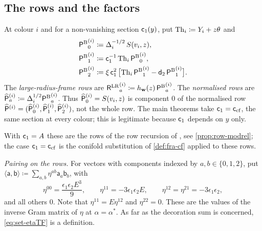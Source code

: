 
\subsection{The rows and the factors}
\label{sec:set-rows}

\begin{defn}
\label{def:set-rows}
At colour $i$ and for a non-vanishing section $\mathsf{c}_{1}(y)$, put $\mathrm{Th}_i\coloneqq Y_i+z\theta$ and
\begin{align*}
{\mathsf{P}^{\mathrm{B}}}_0^{(i)}&\coloneqq\Delta_i^{-1/2}\,S(v_i,z),\\
{\mathsf{P}^{\mathrm{B}}}_1^{(i)}&\coloneqq\mathsf{c}_{1}^{-1}\,\mathrm{Th}_i\,{\mathsf{P}^{\mathrm{B}}}_0^{(i)},\\
{\mathsf{P}^{\mathrm{B}}}_2^{(i)}&\coloneqq\xi\,\mathsf{c}_{1}^{2}\,\big[\mathrm{Th}_i\,{\mathsf{P}^{\mathrm{B}}}_1^{(i)}-\mathsf{d}_{2}\,{\mathsf{P}^{\mathrm{B}}}_1^{(i)}\big].
\end{align*}
The \emph{large-radius-frame rows} are ${\mathsf{R}^{\mathrm{LR}}}_a^{(i)}\coloneqq h_{\mathbf{w}}(z)\,{\mathsf{P}^{\mathrm{B}}}_a^{(i)}$. The \emph{normalised rows} are $\widehat{\mathsf{P}}_a^{(i)}\coloneqq\Delta_i^{1/2}{\mathsf{P}^{\mathrm{B}}}_a^{(i)}$. Thus $\widehat{\mathsf{P}}_0^{(i)}=S(v_i,z)$ is component $0$ of the normalised row $\widehat{\mathsf{P}}^{(i)}=(\widehat{\mathsf{P}}_0^{(i)},\widehat{\mathsf{P}}_1^{(i)},\widehat{\mathsf{P}}_2^{(i)})$, not the whole row. The main theorems take $\mathsf{c}_{1}=\mathsf{c}_{\mathrm{cf}}$, the same section at every colour; this is legitimate because $\mathsf{c}_{1}$ depends on $y$ only.
\end{defn}

With $\mathsf{c}_{1}=A$ these are the rows of the row recursion of \cite{BS}, see \cref{prop:row-modrel}; the case $\mathsf{c}_{1}=\mathsf{c}_{\mathrm{cf}}$ is the conifold substitution of \cref{def:fra-cf} applied to these rows.

\emph{Pairing on the rows.} For vectors with components indexed by $a,b\in\{0,1,2\}$, put $\langle\mathsf{a},\mathsf{b}\rangle\coloneqq\sum_{a,b}\eta^{ab}\mathsf{a}_a\mathsf{b}_b$, with
\begin{equation}
\label{eq:set-etaTF}
\eta^{00}=\frac{\epsilon_1\epsilon_2E^3}{9},\qquad\eta^{11}=-3\epsilon_1\epsilon_2E,\qquad\eta^{12}=\eta^{21}=-3\epsilon_1\epsilon_2,
\end{equation}
and all others $0$. Note that $\eta^{11}=E\eta^{12}$ and $\eta^{22}=0$. These are the values of the inverse Gram matrix of $\eta$ at $\alpha=\alpha^*$. As far as the decoration sum is concerned, \eqref{eq:set-etaTF} is a definition.

